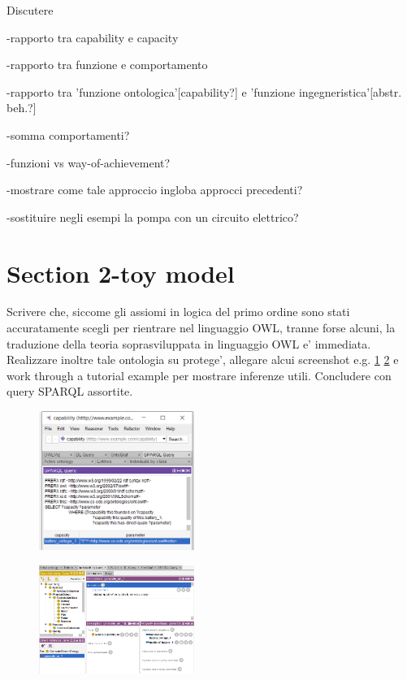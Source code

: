 \documentclass[crcready]{iosart2x}
\newcommand{\TODO}[1]{{\color{red} #1}}
\begin{document}
\TODO{Discutere 

-rapporto tra capability e capacity

-rapporto tra funzione e comportamento

-rapporto tra 'funzione ontologica'[capability?] e 'funzione ingegneristica'[abstr. beh.?]

-somma comportamenti?

-funzioni vs way-of-achievement?

-mostrare come tale approccio ingloba approcci precedenti?

-sostituire negli esempi la pompa con un circuito elettrico?}

\section{\TODO{Section 2-toy model}}\label{sec:......}
\TODO{Scrivere che, siccome gli assiomi in logica del primo ordine sono stati accuratamente scegli per rientrare nel linguaggio OWL, tranne forse alcuni, la traduzione della teoria soprasviluppata in linguaggio OWL e' immediata. 
Realizzare inoltre tale ontologia su protege', allegare alcui screenshot e.g. \ref{fig:screen_query} \ref{fig:screen_entities} e work through a tutorial example per mostrare inferenze utili. Concludere con query SPARQL assortite.}
\begin{figure}
  \centering
  \includegraphics[width=0.45\textwidth]{query_screenshot.PNG}
  \caption{\label{fig:screen_query}}
\end{figure}

\begin{figure}
  \centering
  \includegraphics[width=0.45\textwidth]{entities_screenshot.PNG}
  \caption{\label{fig:screen_entities}}
\end{figure}
\end{document}
